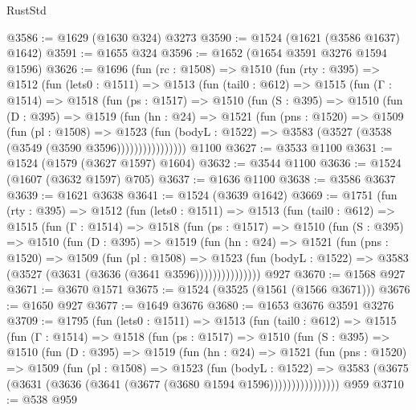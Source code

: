 \begin{lexlean}{RustStd}
\begin{coremodule}
@3586 := @1629 (@1630 @324) @3273
@3590 := @1524 (@1621 (@3586 @1637) @1642)
@3591 := @1655 @324
@3596 := @1652 (@1654 @3591 @3276 @1594 @1596)
@3626 := @1696
    (fun (rc : @1508) =>
    @1510
      (fun (rty : @395) =>
      @1512
        (fun (lets0 : @1511) =>
        @1513
          (fun (tail0 : @612) =>
          @1515
            (fun (Γ : @1514) =>
            @1518
              (fun (ps : @1517) =>
              @1510
                (fun (S : @395) =>
                @1510
                  (fun (D : @395) =>
                  @1519
                    (fun (hn : @24) =>
                    @1521
                      (fun (pns : @1520) =>
                      @1509
                        (fun (pl : @1508) =>
                        @1523
                          (fun (bodyL : @1522) =>
                          @3583 (@3527 (@3538 (@3549 (@3590 @3596))))))))))))))))
    @1100
@3627 := @3533 @1100
@3631 := @1524 (@1579 (@3627 @1597) @1604)
@3632 := @3544 @1100
@3636 := @1524 (@1607 (@3632 @1597) @705)
@3637 := @1636 @1100
@3638 := @3586 @3637
@3639 := @1621 @3638
@3641 := @1524 (@3639 @1642)
@3669 := @1751
    (fun (rty : @395) =>
    @1512
      (fun (lets0 : @1511) =>
      @1513
        (fun (tail0 : @612) =>
        @1515
          (fun (Γ : @1514) =>
          @1518
            (fun (ps : @1517) =>
            @1510
              (fun (S : @395) =>
              @1510
                (fun (D : @395) =>
                @1519
                  (fun (hn : @24) =>
                  @1521
                    (fun (pns : @1520) =>
                    @1509
                      (fun (pl : @1508) =>
                      @1523
                        (fun (bodyL : @1522) =>
                        @3583 (@3527 (@3631 (@3636 (@3641 @3596)))))))))))))))
    @927
@3670 := @1568 @927
@3671 := @3670 @1571
@3675 := @1524 (@3525 (@1561 (@1566 @3671)))
@3676 := @1650 @927
@3677 := @1649 @3676
@3680 := @1653 @3676 @3591 @3276
@3709 := @1795
    (fun (lets0 : @1511) =>
    @1513
      (fun (tail0 : @612) =>
      @1515
        (fun (Γ : @1514) =>
        @1518
          (fun (ps : @1517) =>
          @1510
            (fun (S : @395) =>
            @1510
              (fun (D : @395) =>
              @1519
                (fun (hn : @24) =>
                @1521
                  (fun (pns : @1520) =>
                  @1509
                    (fun (pl : @1508) =>
                    @1523
                      (fun (bodyL : @1522) =>
                      @3583 (@3675 (@3631 (@3636 (@3641 (@3677 (@3680 @1594 @1596))))))))))))))))
    @959
@3710 := @538 @959

\end{coremodule}
\end{lexlean}
